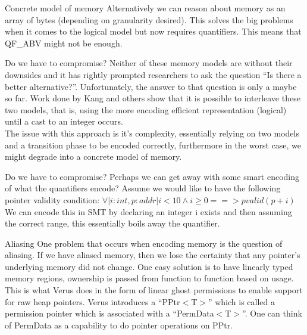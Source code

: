 \documentclass[aspectratio=169]{beamer}
\begin{document}
  \begin{frame}{Concrete model of memory}
    Alternatively we can reason about memory as an array of bytes (depending on granularity desired).
    This solves the big problems when it comes to the logical model but now requires quantifiers. 
    This means that QF\_ABV might not be enough. 
  \end{frame}

  \begin{frame}{Do we have to compromise?}
    Neither of these memory models are without their downsides and it has rightly prompted researchers to ask the question ``Is there a better alternative?''. 
    Unfortunately, the answer to that question is only a maybe so far. Work done by Kang and others show that it is possible to interleave these two models, that is, 
    using the more encoding efficient representation (logical) until a cast to an integer occurs. 
    \\ \vspace{20pt}
    The issue with this approach is it's complexity, essentially relying on two models and a transition phase to be encoded correctly, furthermore in the worst case, 
    we might degrade into a concrete model of memory. 
  \end{frame}

  \begin{frame}{Do we have to compromise?}
    Perhaps we can get away with some smart encoding of what the quantifiers encode?
    Assume we would like to have the following pointer validity condition: $\forall |i: int, p: addr| i < 10 \wedge i \geq 0 ==> pvalid(p+i)$
    We can encode this in SMT by declaring an integer i exists and then assuming the correct range, this essentially boils away the quantifier. 
  \end{frame}

  \begin{frame}{Aliasing}
    One problem that occurs when encoding memory is the question of aliasing. 
    If we have aliased memory, then we lose the certainty that any pointer's underlying memory did not change. 
    One easy solution is to have linearly typed memory regions, ownership is passed from function to function based on usage. 
    This is what Verus does in the form of linear ghost permissions to enable support for raw heap pointers. 
    Verus introduces a ``PPtr$<$T$>$'' which is called a permission pointer which is associated with a ``PermData$<$T$>$''. 
    One can think of PermData as a capability to do pointer operations on PPtr.
  \end{frame}
\end{document}
